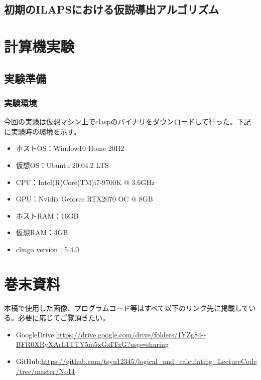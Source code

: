 \documentclass[dvipdfmx]{jsarticle}
\begin{document}
\subsection{初期のILAPSにおける仮説導出アルゴリズム}

\section{計算機実験}
\subsection{実験準備}
  \subsubsection{実験環境}
  今回の実験は仮想マシン上でclaspのバイナリをダウンロードして行った。下記に実験時の環境を示す。
  \begin{itemize}
    \item ホストOS：Window10 Home 20H2
    \item 仮想OS：Ubuntu 20.04.2 LTS
    \item CPU：Intel(R)Core(TM)i7-9700K @ 3.6GHz
    \item GPU：Nvidia Geforce RTX2070 OC @ 8GB
    \item ホストRAM：16GB
    \item 仮想RAM：4GB
    \item clingo version : 5.4.0
  \end{itemize}

\section{巻末資料}
  本稿で使用した画像、プログラムコード等はすべて以下のリンク先に掲載している。必要に応じてご覧頂きたい。
  \begin{itemize}
    \item GoogleDrive:\url{https://drive.google.com/drive/folders/1YZg84--BFR0XRyXArL1TTY5m5xGxITxG?usp=sharing}
    \item GitHub:\url{https://github.com/tsyu12345/logical_and_calculating_LectureCode/tree/master/No14}
  \end{itemize}
\end{document}
